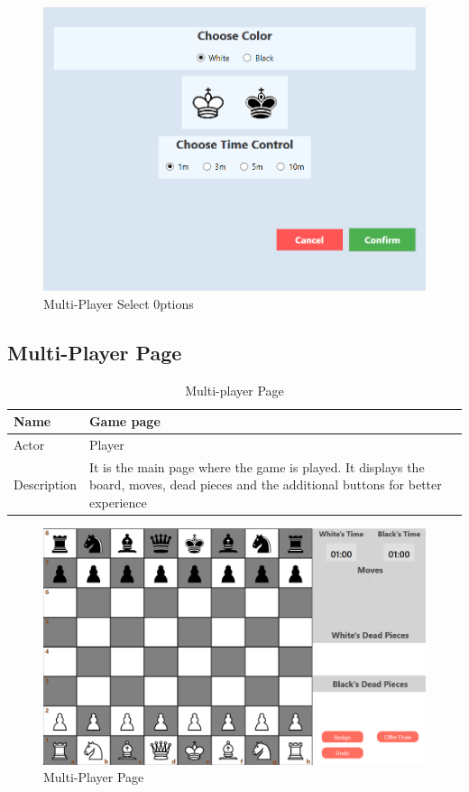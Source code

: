 \documentclass[a4paper,12pt]{article}
\begin{document}
\begin{figure}[H]
    \centering
    \includegraphics[width=0.7\linewidth]{Images/Use Cases/multiplayerSelectOptions.png}
    \caption{Multi-Player Select 0ptions}
    \label{fig:multiplayerSelectOptions}
\end{figure}

\subsection{Multi-Player Page}

\begin{longtable}{|m{}|m{}|}
    \caption{Multi-player Page} \\
    \hline
    Name & Game page \\
    \hline
    Actor & Player \\
    \hline
    Description & It is the main page where the game is played. It displays the board, moves, dead pieces and the additional buttons for better experience \\ 
    \hline
\end{longtable}

\begin{figure}[H]
    \centering
    \includegraphics[width=0.7\linewidth]{Images/Use Cases/multiplayerPage.png}
    \caption{Multi-Player Page}
    \label{fig:multiPlayerPage}
\end{figure}
    
\end{document}
